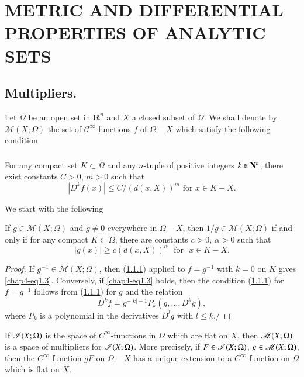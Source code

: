 \chapter{METRIC AND DIFFERENTIAL PROPERTIES OF ANALYTIC SETS}\label{chap4}
\pageoriginale

\section{Multipliers.}\label{chap4-sec1}

Let $\Omega$ be an open set in $\mathbf{R}^n$ and $X$ a closed subset of $\Omega$. We shall denote by $\mathscr{M}(X;\Omega)$ the set of $\mathcal{C}^\infty$-functions $f$ of $\Omega - X$ which satisfy the following condition


\subsection{}\label{chap4-sec1.1} For any compact set $K \subset \Omega$ and any $n$-tuple of positive integers $k \in \mathbf{N}^n$, there exist constants $C>0$, $m > 0$ such that
$$
|D^k f (x)| \leq C / (d (x, X))^m \text{ for } x \in K - X.
$$

We start with the following

\setcounter{theorem}{1}
\begin{lemma}\label{chap4-lem1.2}
  If $g \in \mathscr{M}(X ; \Omega)$ and $g \neq 0$ everywhere in $\Omega-X$, then $1/g \in \mathscr{M}(X ; \Omega)$ if and only if for any compact $K \subset \Omega$, there are constants $c>0$, $\alpha > 0$ such that
  \setcounter{equation}{2}
  \begin{equation}%
    |g(x)| \geq c (d (x, X))^\alpha \text{~ for ~} x \in K - X.\label{chap4-eq1.3}
  \end{equation}
\end{lemma}


\begin{proof}
  If $g^{-1} \in \mathscr{M} (X ; \Omega)$, then (\ref{chap4-sec1.1}) applied to $f = g^{-1}$  with $k=0$ on $K$ gives \eqref{chap4-eq1.3}. Conversely, if \eqref{chap4-eq1.3} holds, then the condition (\ref{chap4-sec1.1}) for $f = g^{-1}$ follows from (\ref{chap4-sec1.1}) for $g$ and the relation
  $$
D^k f = g^{-|k|-1} P_k (g, \ldots, D^k g),
$$
where $P_k$ is a polynomial in the derivatives $D^lg $ with $l \leq k$./
\end{proof}

\setcounter{theorem}{3}
\begin{proposition}\label{chap4-prop1.4}%
  If $\mathscr{I} (X ;\Omega)$ is the space of $C^{\infty}$-functions in $\Omega$ which are flat on $X$, then $\mathscr{M}(X;\Omega)$ is a space of multipliers for $\mathscr{I}(X;\Omega)$. More precisely, if $F \in \mathscr{I}(X;\Omega)$, $g \in \mathscr{M}(X;\Omega)$, then the $C^\infty$-function $gF$ on $\Omega- X$ has a unique extension to a $C^\infty$-function on $\Omega$ which is flat on $X$.
\end{proposition}


